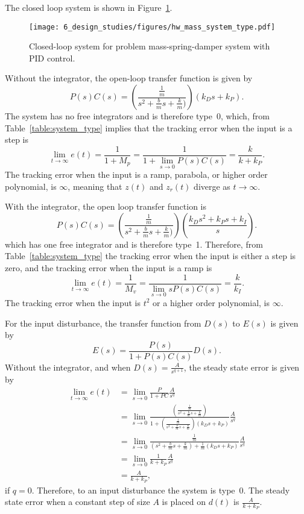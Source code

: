 The closed loop system is shown in Figure~\ref{fig:hw_mass_system_type}.
\begin{figure}[H]
   \centering
   \texttt{[image: 6\_design\_studies/figures/hw\_mass\_system\_type.pdf]}
   \caption{Closed-loop system for problem mass-spring-damper system with PID control.}
   \label{fig:hw_mass_system_type}
\end{figure}
Without the integrator, the open-loop transfer function is given by
\[
P(s)C(s) = \left(\frac{\frac{1}{m}}{s^2 + \frac{b}{m}s + \frac{k}{m})}\right)\left(k_D s + k_P\right).
\]
The system has no free integrators and is therefore type~0, which, from Table~\ref{table:system_type} implies that the tracking error when the input is a step is 
\[
\lim_{t\to\infty}e(t) = \frac{1}{1+M_p} = \frac{1}{1+\lim_{s\to 0} P(s)C(s)} = \frac{k}{k+k_P}.
\]
The tracking error when the input is a ramp, parabola, or higher order polynomial, is $\infty$, meaning that $z(t)$ and $z_r(t)$ diverge as $t\to\infty$.

With the integrator, the open loop transfer function is
\[
P(s)C(s) = \left(\frac{\frac{1}{m}}{s^2+\frac{b}{m}s+\frac{k}{m})}\right)\left(\frac{k_D s^2 + k_Ps + k_I}{s}\right).
\]
which has one free integrator and is therefore type~1. Therefore, from Table~\ref{table:system_type} the tracking error when the input is either a step is zero, and the tracking error when the input is a ramp is
\[
\lim_{t\to\infty}e(t) = \frac{1}{M_v} = \frac{1}{\lim_{s\to 0} sP(s)C(s)} = \frac{k}{k_I}.
\]
The tracking error when the input is $t^2$ or a higher order polynomial, is $\infty$.

For the input disturbance, the transfer function from $D(s)$ to $E(s)$ is given by
\[
E(s) = \frac{P(s)}{1+P(s)C(s)}D(s).
\]
Without the integrator, and when $D(s)= \frac{A}{s^{q+1}}$, the steady state error is given by
\begin{align*}
\lim_{t\to\infty} e(t) &= \lim_{s\to 0} \frac{P}{1+PC}\frac{A}{s^q} \\
&= \lim_{s\to 0} \frac{\left(\frac{\frac{1}{m}}{s^2+\frac{b}{m}s+\frac{k}{m}}\right)}{1+\left(\frac{\frac{1}{m}}{s^2+\frac{b}{m}s+\frac{k}{m}}\right)\left(k_Ds+k_P\right)}\frac{A}{s^q} \\
&= \lim_{s\to 0} \frac{\frac{1}{m}}{\left(s^2+\frac{b}{m}s+\frac{k}{m}\right)+\frac{1}{m}\left(k_Ds+k_P\right)}\frac{A}{s^q} \\
&= \lim_{s\to 0} \frac{1}{k+k_P}\frac{A}{s^q} \\
&= \frac{A}{k+k_P},
\end{align*}
if $q=0$.  Therefore, to an input disturbance the system is type~0.  The steady state error when a constant step of size $A$ is placed on $d(t)$ is $\frac{A}{k+k_P}$.  

